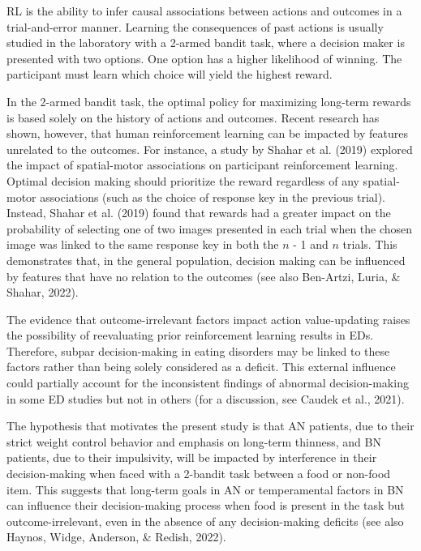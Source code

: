 \documentclass[
  man,floatsintext]{apa6}
\begin{document}
RL is the ability to infer causal associations between actions and outcomes in a trial-and-error manner. Learning the consequences of past actions is usually studied in the laboratory with a 2-armed bandit task, where a decision maker is presented with two options. One option has a higher likelihood of winning. The participant must learn which choice will yield the highest reward.

In the 2-armed bandit task, the optimal policy for maximizing long-term rewards is based solely on the history of actions and outcomes. Recent research has shown, however, that human reinforcement learning can be impacted by features unrelated to the outcomes. For instance, a study by Shahar et al. (2019) explored the impact of spatial-motor associations on participant reinforcement learning. Optimal decision making should prioritize the reward regardless of any spatial-motor associations (such as the choice of response key in the previous trial). Instead, Shahar et al. (2019) found that rewards had a greater impact on the probability of selecting one of two images presented in each trial when the chosen image was linked to the same response key in both the \(n\) - 1 and \(n\) trials. This demonstrates that, in the general population, decision making can be influenced by features that have no relation to the outcomes (see also Ben-Artzi, Luria, \& Shahar, 2022).

The evidence that outcome-irrelevant factors impact action value-updating raises the possibility of reevaluating prior reinforcement learning results in EDs. Therefore, subpar decision-making in eating disorders may be linked to these factors rather than being solely considered as a deficit. This external influence could partially account for the inconsistent findings of abnormal decision-making in some ED studies but not in others (for a discussion, see Caudek et al., 2021).

The hypothesis that motivates the present study is that AN patients, due to their strict weight control behavior and emphasis on long-term thinness, and BN patients, due to their impulsivity, will be impacted by interference in their decision-making when faced with a 2-bandit task between a food or non-food item. This suggests that long-term goals in AN or temperamental factors in BN can influence their decision-making process when food is present in the task but outcome-irrelevant, even in the absence of any decision-making deficits (see also Haynos, Widge, Anderson, \& Redish, 2022).
\end{document}
